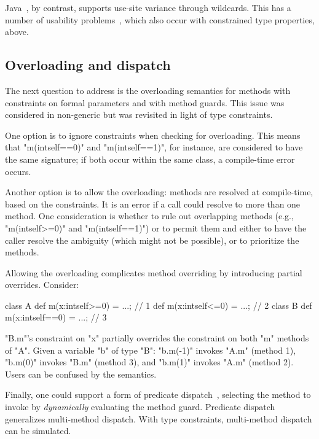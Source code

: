 Java~\cite{Java3}, by contrast, supports use-site variance through wildcards.
This has a number of usability problems~\cite{wildcards-are-evil},
which also occur with constrained type properties, above.

\subsection{Overloading and dispatch}

The next question to address is the overloading semantics for
methods with constraints on formal parameters and with method
guards.  This issue was considered in non-generic \Xten but was
revisited in light of type constraints.

One option is to ignore constraints when checking for
overloading.  This means that \xcd"m(int{self==0})" and
\xcd"m(int{self==1})", for instance, are considered to have the
same signature; if both occur within the same class, a
compile-time error occurs.

Another option is to allow the
overloading: methods are resolved at compile-time, based on the
constraints.  It is an error if a call could resolve to more
than one method.  One consideration is whether to rule out overlapping
methods (e.g., \xcd"m(int{self>=0})" and \xcd"m(int{self==1})")
or to permit them and either to have the caller resolve the
ambiguity (which might not be possible), or to prioritize the
methods.


Allowing the overloading complicates method overriding by
introducing partial overrides.
Consider:
\begin{xtennoindent}
class A {
  def m(x:int{self>=0}) = ...; // 1
  def m(x:int{self<=0}) = ...; // 2
}
class B {
  def m(x:int{self==0}) = ...; // 3
}
\end{xtennoindent}
\noindent
\xcd"B.m"'s constraint on \xcd"x" partially overrides the
constraint on both \xcd"m" methods of \xcd"A".  Given a variable
\xcd"b" of type \xcd"B": \xcd"b.m(-1)" invokes \xcd"A.m" (method 1),
\xcd"b.m(0)" invokes \xcd"B.m" (method 3), and \xcd"b.m(1)"
invokes \xcd"A.m" (method 2).  Users can be confused by the
semantics.

Finally, one could support a form of predicate
dispatch~\cite{jpred}, selecting the method to invoke by
\emph{dynamically} evaluating the method guard.  Predicate
dispatch generalizes multi-method dispatch.  With type
constraints, multi-method dispatch can be simulated.

